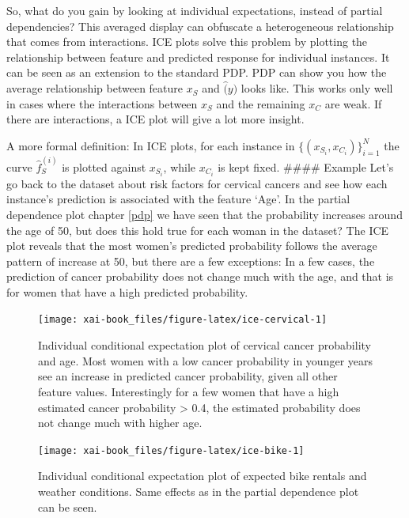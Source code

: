 \documentclass[12pt,]{krantz}
\theoremstyle{definition}
\theoremstyle{definition}
\theoremstyle{definition}
\theoremstyle{remark}
\begin{document}
So, what do you gain by looking at individual expectations, instead of
partial dependencies? This averaged display can obfuscate a
heterogeneous relationship that comes from interactions. ICE plots
\citet{goldstein2015peeking} solve this problem by plotting the
relationship between feature and predicted response for individual
instances. It can be seen as an extension to the standard PDP. PDP can
show you how the average relationship between feature \(x_S\) and
\(\hat(y)\) looks like. This works only well in cases where the
interactions between \(x_S\) and the remaining \(x_C\) are weak. If
there are interactions, a ICE plot will give a lot more insight.

A more formal definition: In ICE plots, for each instance in
\(\{(x_{S_i}, x_{C_i})\}_{i=1}^N\) the curve \(\hat{f}_S^{(i)}\) is
plotted against \(x_{S_i}\), while \(x_{C_i}\) is kept fixed. \#\#\#\#
Example Let's go back to the dataset about risk factors for cervical
cancers and see how each instance's prediction is associated with the
feature `Age'. In the partial dependence plot chapter \ref{pdp} we have
seen that the probability increases around the age of 50, but does this
hold true for each woman in the dataset? The ICE plot reveals that the
most women's predicted probability follows the average pattern of
increase at 50, but there are a few exceptions: In a few cases, the
prediction of cancer probability does not change much with the age, and
that is for women that have a high predicted probability.

\begin{figure}

{\centering \texttt{[image: xai-book\_files/figure-latex/ice-cervical-1]} 

}

\caption{Individual conditional expectation plot of cervical cancer probability and age. Most women with a low cancer probability in younger years see an increase in predicted cancer probability, given all other feature values. Interestingly for a few women that have a high estimated cancer probability > 0.4, the estimated probability does not change much with higher age. }\label{fig:ice-cervical}
\end{figure}

\begin{figure}

{\centering \texttt{[image: xai-book\_files/figure-latex/ice-bike-1]} 

}

\caption{Individual conditional expectation plot of expected bike rentals and weather conditions. Same effects as in the partial dependence plot can be seen.}\label{fig:ice-bike}
\end{figure}
\end{document}
